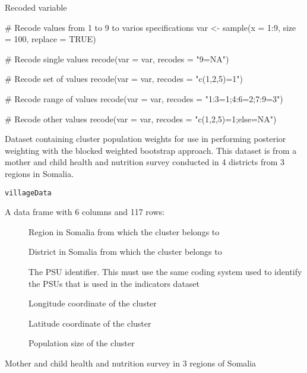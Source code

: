 \documentclass[a4paper]{book}
\begin{document}
%
\begin{Value}
Recoded variable
\end{Value}
%
\begin{Examples}
\begin{ExampleCode}
# Recode values from 1 to 9 to varios specifications
var <- sample(x = 1:9, size = 100, replace = TRUE)

# Recode single values
recode(var = var, recodes = "9=NA")

# Recode set of values
recode(var = var, recodes = "c(1,2,5)=1")

# Recode range of values
recode(var = var, recodes = "1:3=1;4:6=2;7:9=3")

# Recode other values
recode(var = var, recodes = "c(1,2,5)=1;else=NA")

\end{ExampleCode}
\end{Examples}
%
\begin{Description}\relax
Dataset containing cluster population weights for use in performing
posterior weighting with the blocked weighted bootstrap approach. This
dataset is from a mother and child health and nutrition survey conducted in
4 districts from 3 regions in Somalia.
\end{Description}
%
\begin{Usage}
\begin{verbatim}
villageData
\end{verbatim}
\end{Usage}
%
\begin{Format}
A data frame with 6 columns and 117 rows:
\begin{description}

\item[] Region in Somalia from which the cluster belongs to
\item[] District in Somalia from which the cluster belongs to
\item[] The PSU identifier. This must use the same coding system
used to identify the PSUs that is used in the indicators dataset
\item[] Longitude coordinate of the cluster
\item[] Latitude coordinate of the cluster
\item[] Population size of the cluster

\end{description}
\end{Format}
%
\begin{Source}\relax
Mother and child health and nutrition survey in 3 regions of Somalia
\end{Source}
\printindex{}
\end{document}
